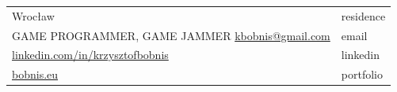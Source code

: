 \documentclass[12pt,a4paper]{article}
\begin{document}
\begin{tabular}  { >{\RaggedLeft} p{16cm}  p{3cm} }  
	{\Large \textbf{KRZYSZTOF BOBNIS}} \hfill Wrocław & \textcolor{techColor}{residence} \\
	 GAME PROGRAMMER, GAME JAMMER \hfill  {\href{mailto:kbobnis@gmail.com}{kbobnis@gmail.com}} & \textcolor{techColor}{email} \\ 
	 \hfill {\href{https://www.linkedin.com/in/krzysztofbobnis}{linkedin.com/in/krzysztofbobnis}} & \textcolor{techColor}{linkedin} \\
	 \hfill {\href{http://bobnis.eu}{bobnis.eu}} & \textcolor{techColor}{portfolio} \\
\end{tabular}	 

\vspace{1cm}
\end{document}
